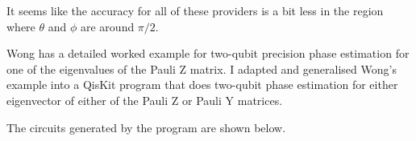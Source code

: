 \documentclass[12pt]{extarticle}
\begin{document}
It seems like the accuracy for all of these providers is a bit less in the region where $\theta$ and $\phi$ are around $\pi/2$.


Wong\cite{wong2024} has a detailed worked example for two-qubit precision phase estimation for one of the eigenvalues of the Pauli Z matrix.
I adapted and generalised Wong's example into a QisKit program that does two-qubit phase estimation for either eigenvector of either of the Pauli Z or Pauli Y matrices.

The circuits generated by the program are shown below.
\end{document}
